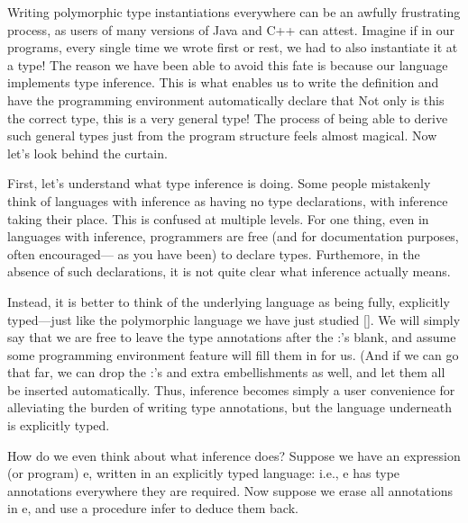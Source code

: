 
Writing polymorphic type instantiations everywhere can be an awfully frustrating
process, as users of many versions of Java and C++ can attest. Imagine if in our
programs, every single time we wrote first or rest, we had to also instantiate
it at a type! The reason we have been able to avoid this fate is because our
language implements type inference. This is what enables us to write the
definition
and have the programming environment automatically declare that
Not only is this the correct type, this is a very general type! The process of
being able to derive such general types just from the program structure feels
almost magical. Now let’s look behind the curtain.

First, let’s understand what type inference is doing. Some people mistakenly
think of languages with inference as having no type declarations, with inference
taking their place. This is confused at multiple levels. For one thing, even in
languages with inference, programmers are free (and for documentation purposes,
often encouraged— as you have been) to declare types. Furthemore, in the absence
of such declarations, it is not quite clear what inference actually means.

Instead, it is better to think of the underlying language as being fully,
explicitly typed—just like the polymorphic language we have just studied \ref{}.
We will simply say that we are free to leave the type annotations after the :’s
blank, and assume some programming environment feature will fill them in for us.
(And if we can go that far, we can drop the :’s and extra embellishments as
well, and let them all be inserted automatically. Thus, inference becomes simply
a user convenience for alleviating the burden of writing type annotations, but
the language underneath is explicitly typed.

How do we even think about what inference does? Suppose we have an expression
(or program) e, written in an explicitly typed language: i.e., e has type
annotations everywhere they are required. Now suppose we erase all annotations
in e, and use a procedure infer to deduce them back.


